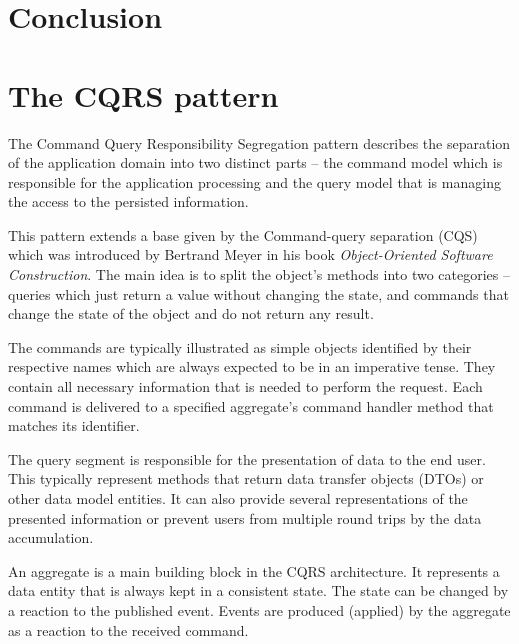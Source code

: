 \documentclass[oneside,
  digital, %
  table,   %
  nolof,     %
  nolot,     %
]{fithesis3}
\begin{document}
\clearpage
\chapter{Conclusion}



\makeatletter\thesis@blocks@clear\makeatother
{} %
\printindex




\appendix %

\chapter{The CQRS pattern}
\label{sec:appendix-cqrs}

The Command Query Responsibility Segregation pattern describes the separation of the application domain into two distinct parts -- the command model which is responsible for the application processing and the query model that is managing the access to the persisted information. 

This pattern extends a base given by the Command-query separation (CQS) which was introduced by Bertrand Meyer in his book \textit{Object-Oriented Software Construction}. The main idea is to split the object's methods into two categories -- queries which just return a value without changing the state, and commands that change the state of the object and do not return any result.

The commands are typically illustrated as simple objects identified by their respective names which are always expected to be in an imperative tense. They contain all necessary information that is needed to perform the request. Each command is delivered to a specified aggregate's command handler method that matches its identifier. 

The query segment is responsible for the presentation of data to the end user. This typically represent methods that return data transfer objects (DTOs) or other data model entities. It can also provide several representations of the presented information or prevent users from multiple round trips by the data accumulation.

An aggregate is a main building block in the CQRS architecture. It represents a data entity that is always kept in a consistent state. The state can be changed by a reaction to the published event. Events are produced (applied) by the aggregate as a reaction to the received command. 
\end{document}
